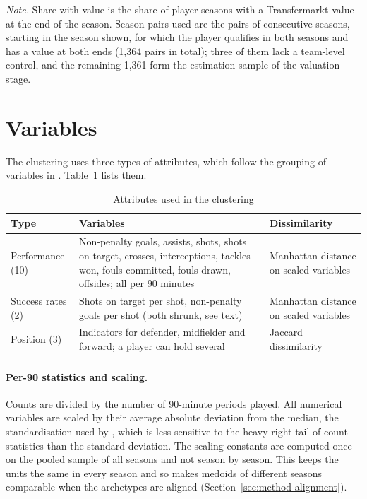 \begin{table}[ht]
	\centering
	\small
	\caption{Sample by season}
	\label{tab:sample}
	
	\par\smallskip
	\parbox{0.9\textwidth}{\footnotesize\emph{Note.} Share with value is the share of player-seasons with a Transfermarkt value at the end of the season. Season pairs used are the pairs of consecutive seasons, starting in the season shown, for which the player qualifies in both seasons and has a value at both ends (1,364 pairs in total); three of them lack a team-level control, and the remaining 1,361 form the estimation sample of the valuation stage.}
\end{table}

\section{Variables}
\label{sec:data-variables}

The clustering uses three types of attributes, which follow the grouping of variables in . Table~\ref{tab:variables} lists them.

\begin{table}[ht]
	\centering
	\small
	\caption{Attributes used in the clustering}
	\label{tab:variables}
	\begin{tabular}{p{2.6cm}p{6.2cm}p{4.8cm}}
		\toprule
		Type & Variables & Dissimilarity \\
		\midrule
		Performance (10) & Non-penalty goals, assists, shots, shots on target, crosses, interceptions, tackles won, fouls committed, fouls drawn, offsides; all per 90 minutes & Manhattan distance on scaled variables \\
		Success rates (2) & Shots on target per shot, non-penalty goals per shot (both shrunk, see text) & Manhattan distance on scaled variables \\
		Position (3) & Indicators for defender, midfielder and forward; a player can hold several & Jaccard dissimilarity \\
		\bottomrule
	\end{tabular}
\end{table}

\paragraph{Per-90 statistics and scaling.} Counts are divided by the number of 90-minute periods played. All numerical variables are scaled by their average absolute deviation from the median, the standardisation used by , which is less sensitive to the heavy right tail of count statistics than the standard deviation. The scaling constants are computed once on the pooled sample of all seasons and not season by season. This keeps the units the same in every season and so makes medoids of different seasons comparable when the archetypes are aligned (Section~\ref{sec:method-alignment}).


